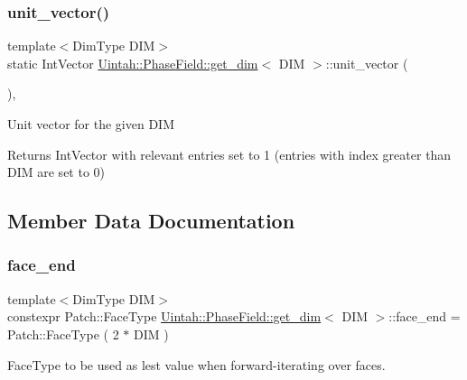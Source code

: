 \subsubsection{\texorpdfstring{unit\+\_\+vector()}{unit\_vector()}}
{\footnotesize\ttfamily template$<$Dim\+Type D\+IM$>$ \\
static Int\+Vector \hyperlink{structUintah_1_1PhaseField_1_1get__dim}{Uintah\+::\+Phase\+Field\+::get\+\_\+dim}$<$ D\+IM $>$\+::unit\+\_\+vector (\begin{DoxyParamCaption}{ }\end{DoxyParamCaption})\hspace{0.3cm}{\ttfamily [inline]}, {\ttfamily [static]}}

Unit vector for the given D\+IM \begin{DoxyReturn}{Returns}
Int\+Vector with relevant entries set to 1 (entries with index greater than D\+IM are set to 0) 
\end{DoxyReturn}


\subsection{Member Data Documentation}
\mbox{\label{structUintah_1_1PhaseField_1_1get__dim_a7efaa82a02b8d74fe1c84bc41938bc6c}} 
\subsubsection{\texorpdfstring{face\+\_\+end}{face\_end}}
{\footnotesize\ttfamily template$<$Dim\+Type D\+IM$>$ \\
constexpr Patch\+::\+Face\+Type \hyperlink{structUintah_1_1PhaseField_1_1get__dim}{Uintah\+::\+Phase\+Field\+::get\+\_\+dim}$<$ D\+IM $>$\+::face\+\_\+end = Patch\+::\+Face\+Type ( 2 $\ast$ D\+IM )\hspace{0.3cm}{\ttfamily [static]}}



Face\+Type to be used as lest value when forward-\/iterating over faces. 

\mbox{\label{structUintah_1_1PhaseField_1_1get__dim_afd8fb64919d3c885e76d9f5f4484dfcf}} 
